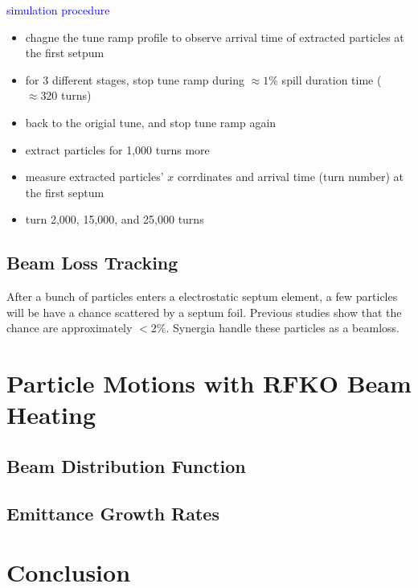 \documentclass[aps,prstab,onecolumn,preprint,endfloats,11pt]{revtex4-1}
\begin{document}
\textcolor{blue}{simulation procedure}
\begin{itemize}
  \item chagne the tune ramp profile to observe arrival time of extracted particles at the first setpum
  \item for 3 different stages, stop tune ramp during $\approx 1 \%$ spill duration time ($\approx 320$ turns)
  \item back to the origial tune, and stop tune ramp again
  \item extract particles for 1,000 turns more
  \item measure extracted particles' $x$ corrdinates and arrival time (turn number) at the first septum
  \item turn 2,000, 15,000, and 25,000 turns
\end{itemize}





\subsection{\label{sec:beamloss}Beam Loss Tracking}

After a bunch of particles enters a electrostatic septum element, a few particles will be have a chance scattered by a septum foil.
Previous studies show that the chance are approximately $< 2 \%$. Synergia handle these particles as a beamloss. 




\clearpage
\section{\label{sec:rfko}Particle Motions with RFKO Beam Heating}

\subsection{\label{sec:dist}Beam Distribution Function}

\subsection{\label{sec:emit}Emittance Growth Rates}

\section{\label{sec:conclusion}Conclusion}
\end{document}
